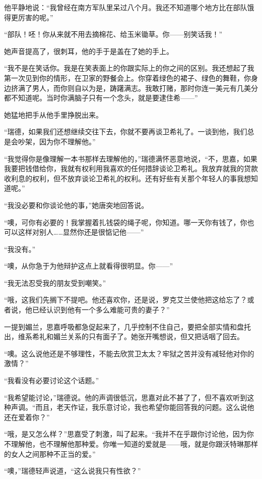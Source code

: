 \par 他平静地说：“我曾经在南方军队里呆过八个月。我还不知道哪个地方比在部队饿得更厉害的呢。”
\par “部队！呸！你从来就不用去摘棉花、给玉米锄草。你——别笑话我！”
\par 她声音提高了，很刺耳，他的手于是盖在了她的手上。
\par “我不是在笑话你。我是在笑表面上的你跟实际上的你之间的区别。我还想起了我第一次见到你的情形，在卫家的野餐会上。你穿着绿色的裙子、绿色的舞鞋，你身边挤满了男人，而你则自以为是，踌躇满志。我敢打赌，那时你连一美元有几美分都不知道呢。当时你满脑子只有一个念头，就是要逮住希——”
\par 她猛地把手从他手里挣脱出来。
\par “瑞德，如果我们还想继续交往下去，你就不要再谈卫希礼了。一谈到他，我们总是会吵架，因为你不理解他。”
\par “我觉得你是像理解一本书那样去理解他的，”瑞德满怀恶意地说，“不，思嘉，如果我要把钱借给你，我就有权利用我喜欢的任何措辞谈论卫希礼。我放弃就我的贷款收利息的权利，但不放弃谈论卫希礼的权利。还有好些有关那个年轻人的事我想知道呢。”
\par “我没必要和你谈论他的事，”她唐突地回答说。
\par “噢，可你有必要的！我掌握着扎钱袋的绳子呢，你知道。哪一天你有钱了，你也可以这样对别人……显然你还是很惦记他——”
\par “我没有。”
\par “噢，从你急于为他辩护这点上就看得很明显。你——”
\par “我无法忍受我的朋友受到嘲笑。”
\par “哦，这我们先搁下不提吧。他还喜欢你，还是说，罗克艾兰使他把这给忘了？或者说，他已经认识到他有一个多么难能可贵的妻子？”
\par 一提到媚兰，思嘉呼吸都急促起来了，几乎控制不住自己，要把全部实情和盘托出，维系希礼和媚兰关系的只有面子了。她张开嘴想说，但又把话咽了回去。
\par “噢。这么说他还是不够理性，不能去欣赏卫太太？牢狱之苦并没有减轻他对你的激情？”
\par “我看没有必要讨论这个话题。”
\par “我希望能讨论，”瑞德说。他的声调很低沉，思嘉对此不甚了了，但不喜欢听到这种声调。“而且，老天作证，我乐意讨论，我也希望你能回答我的问题。这么说他还在爱着你？”
\par “哦，是又怎么样？”思嘉受了刺激，叫了起来。“我并不在乎跟你讨论他，因为你不理解他，也不理解他那种爱。你唯一知道的爱就是——哦，就是你跟沃特琳那样的女人之间那种不正当的爱。”
\par “噢，”瑞德轻声说道，“这么说我只有性欲？”

